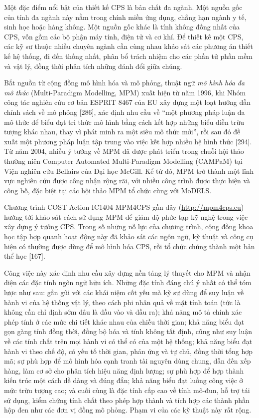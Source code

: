 Một đặc điểm nổi bật của thiết kế CPS là bản chất đa ngành. Một nguồn gốc của tính đa ngành này nằm trong chính miền ứng dụng, chẳng hạn ngành y tế, sinh học hoặc hàng không. Một nguồn gốc khác là tính không đồng nhất của CPS, vốn gồm các bộ phận máy tính, điện tử và cơ khí. Để thiết kế một CPS, các kỹ sư thuộc nhiều chuyên ngành cần cùng nhau khảo sát các phương án thiết kế hệ thống, đi đến thống nhất, phân bổ trách nhiệm cho các phần tử phần mềm và vật lý, đồng thời phân tích những đánh đổi giữa chúng.

Bắt nguồn từ cộng đồng mô hình hóa và mô phỏng, thuật ngữ \emph{mô hình hóa đa mô thức} (Multi-Paradigm Modelling, MPM) xuất hiện từ năm 1996, khi Nhóm công tác nghiên cứu cơ bản ESPRIT 8467 của EU xây dựng một loạt hướng dẫn chính sách về mô phỏng [286], xác định nhu cầu về ``một phương pháp luận đa mô thức để biểu đạt tri thức mô hình bằng cách kết hợp những biểu diễn trừu tượng khác nhau, thay vì phát minh ra một siêu mô thức mới'', rồi sau đó đề xuất một phương pháp luận tập trung vào việc kết hợp nhiều hệ hình thức [294]. Từ năm 2004, nhiều ý tưởng về MPM đã được phát triển trong chuỗi hội thảo thường niên Computer Automated Multi-Paradigm Modelling (CAMPaM) tại Viện nghiên cứu Bellairs của Đại học McGill. Kể từ đó, MPM trở thành một lĩnh vực nghiên cứu được công nhận rộng rãi, với nhiều công trình được thực hiện và công bố, đặc biệt tại các hội thảo MPM tổ chức cùng với MoDELS.

Chương trình COST Action IC1404 MPM4CPS gần đây (\url{http://mpm4cps.eu}) hướng tới khảo sát cách sử dụng MPM để giảm độ phức tạp kỹ nghệ trong việc xây dựng ý tưởng CPS. Trong số những nỗ lực của chương trình, cộng đồng khoa học tập hợp quanh hoạt động này đã khảo sát các ngôn ngữ, kỹ thuật và công cụ hiện có thường được dùng để mô hình hóa CPS, rồi tổ chức chúng thành một bản thể học [167].

Công việc này xác định nhu cầu xây dựng nền tảng lý thuyết cho MPM và nhận diện các đặc tính ngôn ngữ hữu ích. Những đặc tính đáng chú ý nhất có thể tóm lược như sau: gần gũi với các khái niệm cốt yếu mà kỹ sư dùng để suy luận về hành vi của hệ thống vật lý, theo cách phi nhân quả về mặt tính toán (tức là không cần chỉ định sớm đâu là đầu vào và đầu ra); khả năng mô tả chính xác phép tính ở các mức chi tiết khác nhau của chiều thời gian; khả năng biểu đạt gọn gàng tính đồng thời, đồng bộ hóa và tính không tất định, cũng như suy luận về các tính chất trên mọi hành vi có thể có của một hệ thống; khả năng biểu đạt hành vi theo chế độ, có yếu tố thời gian, phản ứng và tự chủ, đồng thời tổng hợp mã; sự phù hợp để mô hình hóa cạnh tranh tài nguyên dùng chung, dẫn đến xếp hàng, làm cơ sở cho phân tích hiệu năng định lượng; sự phù hợp để hợp thành kiến trúc một cách dễ dàng và đúng đắn; khả năng biểu đạt luồng công việc ở mức trừu tượng cao; và cuối cùng là đặc tính cấp cao về tính mô-đun, hỗ trợ tái sử dụng, kiểm chứng tính chất theo phép hợp thành và tích hợp các thành phần hộp đen như các đơn vị đồng mô phỏng. Phạm vi của các kỹ thuật này rất rộng.

